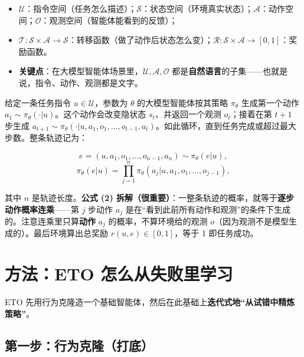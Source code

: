 \documentclass[11pt,UTF8,fontset=fandol]{ctexart}
\begin{document}
\begin{itemize}[leftmargin=2em,itemsep=2pt]
\item $\mathcal{U}$：指令空间（任务怎么描述）；$\mathcal{S}$：状态空间（环境真实状态）；$\mathcal{A}$：动作空间；$\mathcal{O}$：观测空间（智能体能看到的反馈）；
\item $\mathcal{T}: \mathcal{S}\times\mathcal{A}\to\mathcal{S}$：转移函数（做了动作后状态怎么变）；$\mathcal{R}: \mathcal{S}\times\mathcal{A}\to[0,1]$：奖励函数。
\item \textbf{关键点}：在大模型智能体场景里，$\mathcal{U}, \mathcal{A}, \mathcal{O}$ 都是\textbf{自然语言}的子集——也就是说，指令、动作、观测都是文字。
\end{itemize}

给定一条任务指令 $u\in\mathcal{U}$，参数为 $\theta$ 的大模型智能体按其策略 $\pi_\theta$ 生成第一个动作 $a_1\sim\pi_\theta(\cdot|u)$。这个动作会改变隐状态 $s_t$、并返回一个观测 $o_t$；接着在第 $t{+}1$ 步生成 $a_{t+1}\sim\pi_\theta(\cdot|u, a_1, o_1, \dots, o_{t-1}, a_t)$。如此循环，直到任务完成或超过最大步数。整条轨迹记为：

\begin{equation*}
e = (u, a_1, o_1, \dots, o_{n-1}, a_n) \sim \pi_\theta(e|u), \tag{1}
\end{equation*}
\begin{equation*}
\pi_\theta(e|u) = \prod_{j=1}^{n} \pi_\theta(a_j | u, a_1, o_1, \dots, o_{j-1}), \tag{2}
\end{equation*}

其中 $n$ 是轨迹长度。\textbf{公式 (2) 拆解（很重要）}：一整条轨迹的概率，就等于\textbf{逐步动作概率连乘}——第 $j$ 步动作 $a_j$ 是在“看到此前所有动作和观测”的条件下生成的。注意连乘里只算\textbf{动作} $a_j$ 的概率，不算环境给的观测 $o$（因为观测不是模型生成的）。最后环境算出总奖励 $r(u,e)\in[0,1]$，等于 1 即任务成功。

\section{方法：ETO 怎么从失败里学习}

ETO 先用行为克隆造一个基础智能体，然后在此基础上\textbf{迭代式地“从试错中精炼策略”}。

\subsection{第一步：行为克隆（打底）}
\end{document}
